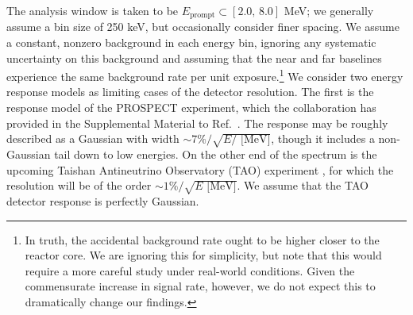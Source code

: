 \documentclass[prd, twocolumn, tightenlines, twoside, secnumarabic, superscriptaddress, preprintnumbers, nofootinbib, notitlepage]{revtex4-1}
\begin{document}
The analysis window is taken to be $E_\text{prompt} \subset [2.0, \, 8.0]$ MeV; we generally assume a bin size of 250 keV, but occasionally consider finer spacing. We assume a constant, nonzero background in each energy bin, ignoring any systematic uncertainty on this background and assuming that the near and far baselines experience the same background rate per unit exposure.\footnote{In truth, the accidental background rate ought to be higher closer to the reactor core. We are ignoring this for simplicity, but note that this would require a more careful study under real-world conditions. Given the commensurate increase in signal rate, however, we do not expect this to dramatically change our findings.} We consider two energy response models as limiting cases of the detector resolution. The first is the response model of the PROSPECT experiment, which the collaboration has provided in the Supplemental Material to Ref.~\cite{Andriamirado:2020erz}. The response may be roughly described as a Gaussian with width $\sim7\%/\sqrt{E/\text{ [MeV]}}$, though it includes a non-Gaussian tail down to low energies. On the other end of the spectrum is the upcoming Taishan Antineutrino Observatory (TAO) experiment \cite{Abusleme:2020bzt}, for which the resolution will be of the order $\sim1\%/\sqrt{E\text{ [MeV]}}$. We assume that the TAO detector response is perfectly Gaussian.
\end{document}
